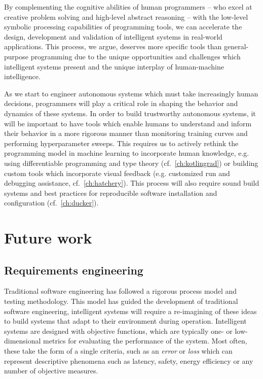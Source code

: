 \documentclass[12pt,initial,twoside,maitrise]{dms}
\numberwithin{equation}{section}
\numberwithin{table}{chapter}
\numberwithin{figure}{chapter}
\begin{document}
By complementing the cognitive abilities of human programmers -- who excel at creative problem solving and high-level abstract reasoning -- with the low-level symbolic processing capabilities of programming tools, we can accelerate the design, development and validation of intelligent systems in real-world applications. This process, we argue, deserves more specific tools than general-purpose programming due to the unique opportunities and challenges which intelligent systems present and the unique interplay of human-machine intelligence.

As we start to engineer autonomous systems which must take increasingly human decisions, programmers will play a critical role in shaping the behavior and dynamics of these systems. In order to build trustworthy autonomous systems, it will be important to have tools which enable humans to understand and inform their behavior in a more rigorous manner than monitoring training curves and performing hyperparameter sweeps. This requires us to actively rethink the programming model in machine learning to incorporate human knowledge, e.g. using differentiable programming and type theory (cf.~\autoref{ch:kotlingrad}) or building custom tools which incorporate visual feedback (e.g. customized run and debugging assistance, cf.~\autoref{ch:hatchery}). This process will also require sound build systems and best practices for reproducible software installation and configuration (cf.~\autoref{ch:ducker}).

\section{Future work}

\subsection{Requirements engineering}

Traditional software engineering has followed a rigorous process model and testing methodology. This model has guided the development of traditional software engineering, intelligent systems will require a re-imagining of these ideas to build systems that adapt to their environment during operation. Intelligent systems are designed with objective functions, which are typically one- or low-dimensional metrics for evaluating the performance of the system. Most often, these take the form of a single criteria, such as an \textit{error} or \textit{loss} which can represent descriptive phenomena such as latency, safety, energy efficiency or any number of objective measures.
\end{document}

